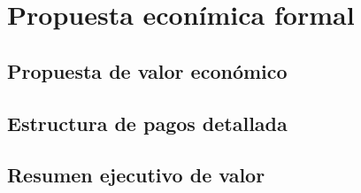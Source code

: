 
\chapter{Propuesta econímica formal}


\section{Propuesta de valor económico}



\section{Estructura de pagos detallada}





\section{Resumen ejecutivo de valor}


